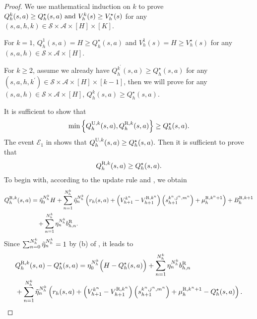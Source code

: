 \documentclass{article}
\newcommand{\U}{\textnormal{U}}
\newcommand{\R}{\textnormal{R}}
\begin{document}
\begin{proof}
    We use mathematical induction on $k$ to prove $Q_h^k(s,a) \geq Q_h^{\star}(s,a) \textnormal{ and } V_h^k(s) \geq V_h^\star(s)$ for any $(s,a,h,k) \in \mathcal{S} \times \mathcal{A} \times [H] \times [K]$. 
    
    For $k=1$, $Q_h^1(s,a) = H \geq Q_h^{\star}(s,a)$ and $V_h^1(s) = H \geq V_h^{\star}(s)$ for any $(s,a,h) \in \mathcal{S} \times \mathcal{A} \times [H]$. 
    
    For $k \geq 2$, assume we already have $Q_h^{k^\prime}(s,a) \geq Q_h^{\star}(s,a)$ for any $(s,a,h,k^\prime) \in \mathcal{S} \times \mathcal{A} \times [H] \times [k-1]$, then we will prove for any $(s,a,h) \in \mathcal{S} \times \mathcal{A} \times [H]$, $Q_h^{k}(s,a) \geq Q_h^{\star}(s,a)$.

    It is sufficient to show that 
    $$\min\left\{Q_h^{\U,k}(s,a),Q_h^{\R,k}(s,a)\right\} \geq  Q_h^{\star}(s,a).$$
    The event $\mathcal{E}_1$ in  shows that $Q_h^{\U,k}(s,a) \geq Q_h^{\star}(s,a).$ Then it is sufficient to prove that
    \begin{equation}
    \label{Rgeqstar}
        Q_h^{\R,k}(s,a)\geq Q_h^{\star}(s,a).
    \end{equation}
    To begin with, according to the update rule  and , we obtain
    \begin{align*}
        Q_h^{\R,k}(s,a) &= \Tilde{\eta}_0^{N_h^k} H + \sum_{n=1}^{N_h^k} \Tilde{\eta}_n^{N_h^k} \left( r_h(s, a) + \left(V_{h+1}^{k^n}-V_{h+1}^{\R,k^n}\right)\left(s_{h+1}^{k^n,j^n,m^n}\right)   + \mu_h^{\R,k^n+1}\right) + B_h^{\R,k+1} \nonumber\\
        &\quad + \sum_{n=1}^{N_h^k} \eta_n^{N_h^k}b_{h,n}^{\R}.
    \end{align*}
   Since $\sum_{n=0}^{N_h^k}\Tilde{\eta}_n^{N_h^k} = 1$ by (b) of , it leads to
    \begin{align}
    \label{k-starmiddle}
        &Q_h^{\R,k}(s, a) - Q_h^{\star}(s, a) = \eta_0^{N_h^k} \Big(H - Q_h^{\star}(s, a) \Big) + \sum_{n=1}^{N_h^k} \eta_n^{N_h^k}b_{h,n}^{\R}\nonumber \\
        &+ \sum_{n=1}^{N_h^k} \Tilde{\eta}_n^{N_h^k} \left( r_h(s, a) + \left(V_{h+1}^{k^n}-V_{h+1}^{\R,k^n}\right)\left(s_{h+1}^{k^n,j^n,m^n}\right)   + \mu_h^{\R,k^n+1}- Q_h^{\star}(s, a)\right).
    \end{align}
    

\end{proof}
\end{document}
